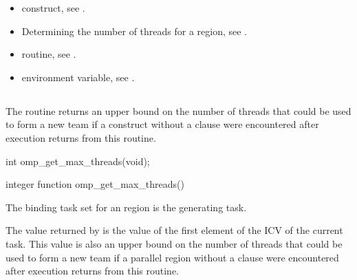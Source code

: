 \crossreferences
\begin{itemize}
\item {} construct, see 
.

\item Determining the number of threads for a  region, see
. 

\item {} routine, see 
.

\item {} environment variable, see 
.
\end{itemize}










\subsection{}
\label{subsec:omp_get_max_threads}
\summary
The  routine returns an upper bound on the number of 
threads that could be used to form a new team if a  construct without a 
 clause were encountered after execution returns from this routine.

\format
\ccppspecificstart
\begin{boxedcode}
int omp\_get\_max\_threads(void);
\end{boxedcode}
\ccppspecificend

\fortranspecificstart
\begin{boxedcode}
integer function omp\_get\_max\_threads()
\end{boxedcode}
\fortranspecificend

\binding
The binding task set for an  region is the generating task. 

\effect
The value returned by  is the value of the first element of 
the  ICV of the current task. This value is also an upper bound on the 
number of threads that could be used to form a new team if a parallel region without a 
 clause were encountered after execution returns from this routine.

